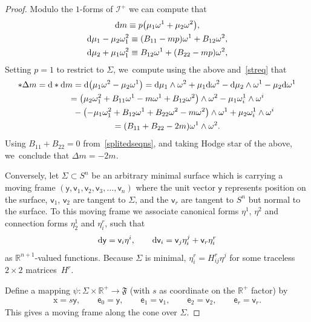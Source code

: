 \documentclass[pdftex]{sigma}
\def\R{\mathbb{R}}
\def\ve{\mathsf{e}}
\def\vv{\mathsf{v}}
\def\vx{\boldsymbol{\mathrm{x}}}
\def\vy{\mathsf{y}}
\def\F{\mathfrak{F}}
\def\calI{\mathcal{I}}
\def\w{\omega}
\numberwithin{equation}{section}
\begin{document}
\begin{proof}
Modulo the $1$-forms of $\calI^+$ we can compute that
\begin{gather*}
{\rm d}m \equiv p\big(\mu_1 \w^1 + \mu_2 \w^2\big),
\\
{\rm d}\mu_1 -\mu_2 \w^2_1 \equiv (B_{11} -mp) \w^1 + B_{12} \w^2,
\\
{\rm d}\mu_2 +\mu_1 \w^2_1 \equiv B_{12} \w^1 + (B_{22} - mp) \w^2,
\end{gather*}
Setting $p=1$ to restrict to $\Sigma$, we~compute using the above and~\eqref{streq} that
\begin{gather*}
* \Delta m = {\rm d} * {\rm d} m = {\rm d} \big( \mu_1 \w^2 - \mu_2 \w^1 \big)
 = {\rm d} \mu_1 \wedge \w^2 + \mu_1 {\rm d} \w^2 - {\rm d}\mu_2 \wedge \w^1 - \mu_2 {\rm d}\w^1
 \\ \hphantom{* \Delta m }
 {}= \big( \mu_2 \w^2_1 + B_{11} \w^1 - m \w^1 + B_{12} \w^2\big) \wedge \w^2 - \mu_1 \w^1_i \wedge \w^i
 \\ \hphantom{* \Delta m= ( }
{} - \big( {-} \mu_1 \w^2_1 + B_{12} \w^1 + B_{22} \w^2 - m \w^2 \big) \wedge \w^1 + \mu_2 \w^1_i \wedge \w^i
\\ \hphantom{* \Delta m }
{} = ( B_{11} + B_{22} - 2 m) \w^1 \wedge \w^2.
\end{gather*}
Using $B_{11} + B_{22}=0$ from~\eqref{splitedseqns}, and taking Hodge star of the above, we~conclude that \mbox{$\Delta m = -2m$}.

Conversely, let $\Sigma \subset S^n$ be an arbitrary minimal surface which is carrying a moving frame $(\vy,\vv_1,\vv_2,\vv_3,\dots, \vv_n)$ where the unit vector $\vy$ represents position on the surface, $\vv_1$, $\vv_2$ are tangent to $\Sigma$, and the $\vv_r$ are tangent to $S^n$ but normal to the surface. To this moving frame we associate canonical forms $\eta^1$, $\eta^2$ and connection forms $\eta^1_2$ and $\eta^r_i$, such that
\begin{gather*}
{\rm d}\vy = \vv_i \eta^i, \qquad
 {\rm d}\vv_i = \vv_j \eta^j_i + \vv_r \eta^r_i
\end{gather*}
as $\R^{n+1}$-valued functions. Because $\Sigma$ is minimal, $\eta^r_i = H^r_{ij}\eta^j$ for some traceless $2\times 2$ matrices~$H^r$.

Define a mapping $\psi\colon \Sigma \times \R^+ \to \F$ (with $s$ as coordinate on the $\R^+$ factor) by
\begin{gather*}
\vx = s \vy,\qquad
\ve_0 = \vy, \qquad
\ve_1 = \vv_1, \qquad
\ve_2 = \vv_2, \qquad
\ve_r = \vv_r.
\end{gather*}
This gives a moving frame along the cone over $\Sigma$.


\end{proof}
\end{document}
